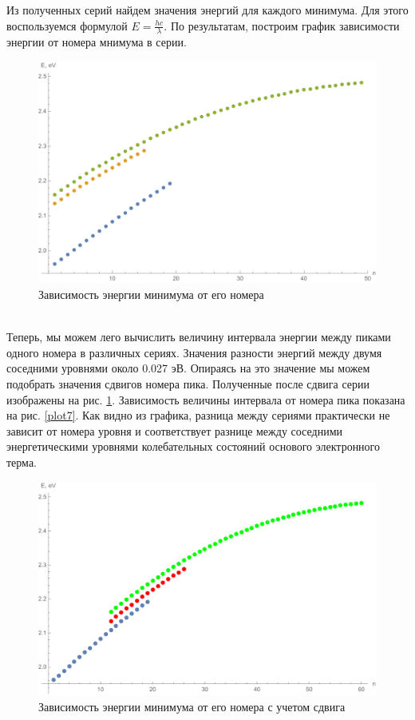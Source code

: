 \documentclass[a4paper, 12pt]{article}
\begin{document}
Из полученных серий найдем значения энергий для каждого минимума. Для этого воспользуемся формулой $E=\frac{h c}{\lambda}$. По результатам, построим график зависимости энергии от номера мнимума в серии.
\begin{figure}[!htb]
\centering
\includegraphics[scale=0.7]{plot5.pdf}
\caption{Зависимость энергии минимума от его номера}
\end{figure}\\
Теперь, мы можем лего вычислить величину интервала энергии между пиками одного номера в различных сериях. Значения разности энергий между двумя соседними уровнями около 0.027 эВ. Опираясь на это значение мы можем подобрать значения сдвигов номера пика. Полученные после сдвига серии изображены на рис. \ref{plot6}. Зависимость величины интервала от номера пика показана на рис. \ref{plot7}. Как видно из графика, разница между сериями практически не зависит от номера уровня и соответствует разнице между соседними энергетическими уровнями колебательных состояний основого электронного терма.
\begin{figure}[!htb]
\centering
\includegraphics[scale=0.6]{plot6.pdf}
\caption{Зависимость энергии минимума от его номера с учетом сдвига}
\label{plot6}
\end{figure}
\end{document}
